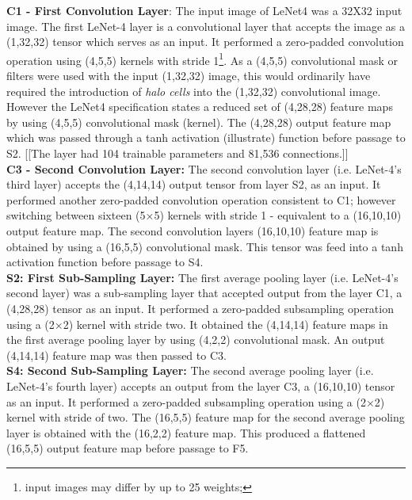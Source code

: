 \documentclass[7pt]{article}
\begin{document}
\textbf{C1 - First Convolution Layer}: The input image of LeNet4 was a 32X32 input image. The first LeNet-4 layer is a convolutional layer that accepts the image as a (1,32,32) tensor which serves as an input. It performed a zero-padded convolution operation using (4,5,5) kernels with stride 1\footnote{input images may differ by up to 25 weights;}.  As a (4,5,5) convolutional mask or filters were used with the input (1,32,32) image, this would ordinarily have required the introduction of \emph{halo cells} into the (1,32,32) convolutional image. However the LeNet4 specification states a reduced set of (4,28,28) feature maps by using (4,5,5) convolutional mask (kernel). The (4,28,28) output feature map which was passed through a tanh activation (illustrate) function before passage to S2. [[The layer had 104 trainable parameters and 81,536 connections.]] \\

\textbf{C3 - Second Convolution Layer:} The second convolution layer (i.e. LeNet-4’s third layer) accepts the (4,14,14) output tensor from layer S2, as an input. It performed another  zero-padded convolution operation consistent to C1; however switching between sixteen (5×5) kernels with stride 1 - equivalent to a (16,10,10) output feature map. The second convolution layers (16,10,10) feature map is obtained by using a (16,5,5) convolutional mask.  This tensor was feed into a tanh activation function before passage to S4.  \\

\textbf{S2: First Sub-Sampling Layer:} The first average pooling layer (i.e. LeNet-4’s second layer) was a sub-sampling layer that accepted output from the layer C1, a (4,28,28) tensor as an input. It performed a zero-padded subsampling operation using a (2×2) kernel with stride two.  It obtained the (4,14,14) feature maps in the first average pooling layer by using (4,2,2) convolutional mask. An output (4,14,14) feature map was then passed to C3. \\


\textbf{S4: Second Sub-Sampling Layer:} The second average pooling layer (i.e. LeNet-4's fourth layer) accepts an output from the layer C3, a (16,10,10) tensor as an input. It performed a zero-padded subsampling operation using a (2×2) kernel with stride of two. The (16,5,5) feature map for the second average pooling layer is obtained with the (16,2,2) feature map. This produced a flattened (16,5,5) output feature map before passage to F5. \\
\end{document}
